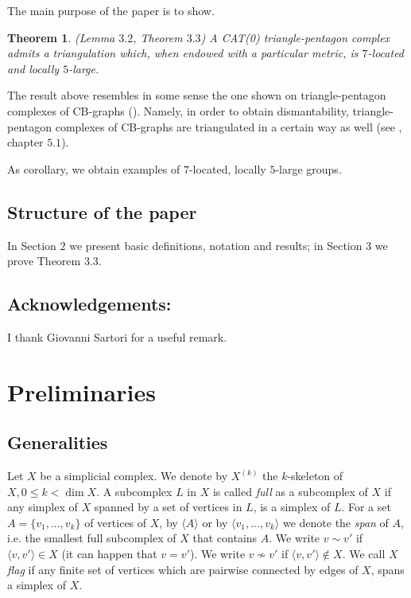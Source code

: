 \documentclass{amsart}
\newtheorem*{theorem*}{Theorem}
\theoremstyle{definition}
\theoremstyle{remark}
\numberwithin{equation}{section}
\begin{document}
The main purpose of the paper is to show.


\begin{theorem*}  (Lemma $3.2$, Theorem $3.3$) 
A CAT(0) triangle-pentagon complex admits a triangulation which, when endowed with a particular metric, is $7$-located and locally $5$-large.
\end{theorem*}


The result above resembles in some sense the one shown on triangle-pentagon complexes of CB-graphs (\cite{CCG}). Namely, in order to obtain dismantability, triangle-pentagon complexes of CB-graphs are triangulated in a certain way as well (see \cite{CCG}, chapter $5.1$).

As corollary, we obtain examples of $7$-located, locally $5$-large groups.


\subsection{Structure of the paper} In Section $2$ we present basic definitions,
notation and results; in Section $3$ we prove Theorem $3.3$.


\subsection{Acknowledgements:} I thank Giovanni Sartori for a useful remark.

\section{Preliminaries}

\subsection{Generalities}


Let $X$ be a simplicial complex.
We denote by $X^{(k)}$ the $k$-skeleton of $X, 0 \leq k < \dim X$.
A subcomplex $L$ in $X$ is called \emph{full} as a subcomplex of $X$ if any simplex of $X$ spanned by a set of vertices in $L$, is a simplex of $L$.
For a set $A = \{ v_{1}, ..., v_{k} \}$ of vertices of $X$, by $\langle A \rangle$ or by $\langle  v_{1}, ..., v_{k} \rangle$ we denote the \emph{span} of $A$, i.e. the smallest full subcomplex of $X$ that contains $A$.
We write $v \sim v'$ if $\langle  v,v' \rangle \in X$ (it can happen that $v = v'$).
We write $v \nsim v'$ if $\langle  v,v' \rangle \notin X$.
We call $X$ {\it flag} if any finite set of vertices which are pairwise connected by edges of $X$, spans a simplex of $X$.
\end{document}
